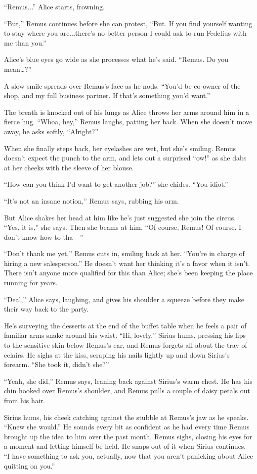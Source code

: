 “Remus...” Alice starts, frowning.

“But,” Remus continues before she can protest, “But. If you find yourself wanting to stay where you are...there’s no better person I could ask to run Fedelius with me than you.”

Alice’s blue eyes go wide as she processes what he’s said. “Remus. Do you mean…?”

A slow smile spreads over Remus’s face as he nods. “You’d be co-owner of the shop, and my full business partner. If that’s something you’d want.”

The breath is knocked out of his lungs as Alice throws her arms around him in a fierce hug. “Whoa, hey,” Remus laughs, patting her back. When she doesn’t move away, he asks softly, “Alright?”

When she finally steps back, her eyelashes are wet, but she’s smiling. Remus doesn’t expect the punch to the arm, and lets out a surprised “ow!” as she dabs at her cheeks with the sleeve of her blouse.

“How can you think I’d want to get another job?” she chides. “You idiot.”

“It’s not an insane notion,” Remus says, rubbing his arm.

But Alice shakes her head at him like he’s just suggested she join the circus. “Yes, it is,” she says. Then she beams at him. “Of course, Remus! Of course. I don’t know how to tha—”

“Don’t thank me yet,” Remus cuts in, smiling back at her. “You’re in charge of hiring a new salesperson.” He doesn’t want her thinking it’s a favor when it isn’t. There isn’t anyone more qualified for this than Alice; she’s been keeping the place running for years.

“Deal,” Alice says, laughing, and gives his shoulder a squeeze before they make their way back to the party.

He’s surveying the desserts at the end of the buffet table when he feels a pair of familiar arms snake around his waist. “Hi, lovely,” Sirius hums, pressing his lips to the sensitive skin below Remus’s ear, and Remus forgets all about the tray of eclairs. He sighs at the kiss, scraping his nails lightly up and down Sirius’s forearm. “She took it, didn’t she?”

“Yeah, she did,” Remus says, leaning back against Sirius’s warm chest. He has his chin hooked over Remus’s shoulder, and Remus pulls a couple of daisy petals out from his hair.

Sirius hums, his cheek catching against the stubble at Remus’s jaw as he speaks. “Knew she would.” He sounds every bit as confident as he had every time Remus brought up the idea to him over the past month. Remus sighs, closing his eyes for a moment and letting himself be held. He snaps out of it when Sirius continues, “I have something to ask you, actually, now that you aren’t panicking about Alice quitting on you.”

